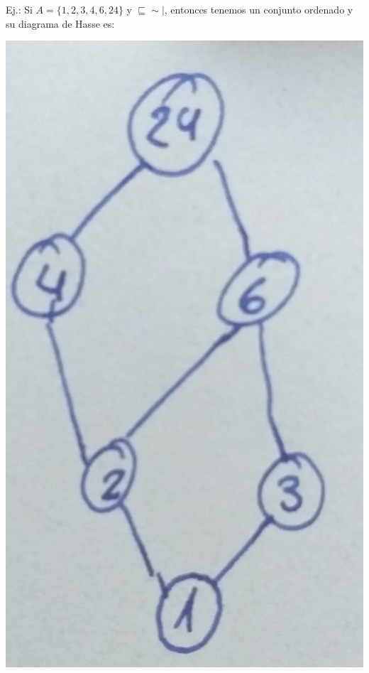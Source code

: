\documentclass[10pt,a4paper,openright]{book}
\begin{document}
Ej.: Si $A=\{1,2,3,4,6,24\}$ y $\sqsubseteq \sim \mid$, entonces tenemos un conjunto ordenado y su diagrama de Hasse es: 
\begin{center}
\includegraphics[scale=0.15]{Diagrama de Hasse}
\end{center}
\end{document}
